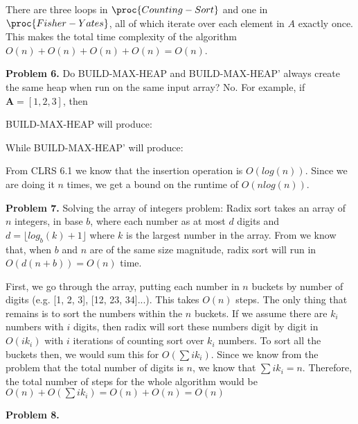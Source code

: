 \documentclass{article}
\begin{document}
There are three loops in $\proc{Counting-Sort}$ and one in $\proc{Fisher-Yates}$, all of which iterate over each element in $A$ exactly once. This makes the total time complexity of the algorithm $O(n) + O(n) + O(n) + O(n) = O(n)$.

\hfill

\textbf{Problem 6.} Do BUILD-MAX-HEAP and BUILD-MAX-HEAP' always create the same heap when run on the same input array? No. For example, if $\pmb A = [1, 2, 3]$, then

BUILD-MAX-HEAP will produce:

\begin{center}
\end{center}

While BUILD-MAX-HEAP' will produce:

\begin{center}
\end{center}

From CLRS 6.1 \cite{CLRS} we know that the insertion operation is $O(log(n))$. Since we are doing it $n$ times, we get a bound on the runtime of $O(nlog(n))$.

\hfill

\textbf{Problem 7.} Solving the array of integers problem: Radix sort takes an array of $n$ integers, in base $b$, where each number as at most $d$ digits and $d = \lfloor log_b(k) + 1 \rfloor$ where $k$ is the largest number in the array. From \cite{website:3} we know that, when $b$ and $n$ are of the same size magnitude, radix sort will run in $O(d(n+b)) = O(n)$ time. 

First, we go through the array, putting each number in $n$ buckets by number of digits (e.g. [1, 2, 3], [12, 23, 34]...). This takes $O(n)$ steps. The only thing that remains is to sort the numbers within the $n$ buckets. If we assume there are $k_i$ numbers with $i$ digits, then radix will sort these numbers digit by digit in $O(ik_i)$ with $i$ iterations of counting sort over $k_i$ numbers. To sort all the buckets then, we would sum this for $O(\sum ik_i)$. Since we know from the problem that the total number of digits is $n$, we know that $\sum ik_i = n$. Therefore, the total number of steps for the whole algorithm would be $O(n) + O(\sum ik_i) = O(n) + O(n) = O(n)$

\hfill

\textbf{Problem 8.} 


\newpage
 

\end{document}

